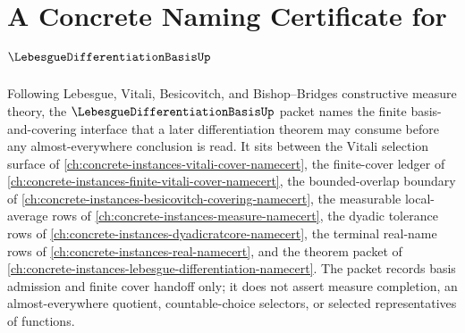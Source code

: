 \chapter{A Concrete Naming Certificate for $\LebesgueDifferentiationBasisUp$}
\label{ch:concrete-instances-lebesgue-differentiation-basis-namecert}

Following Lebesgue, Vitali, Besicovitch, and Bishop--Bridges constructive measure theory, the $\LebesgueDifferentiationBasisUp$ packet names the finite basis-and-covering interface that a later differentiation theorem may consume before any almost-everywhere conclusion is read. It sits between the Vitali selection surface of \autoref{ch:concrete-instances-vitali-cover-namecert}, the finite-cover ledger of \autoref{ch:concrete-instances-finite-vitali-cover-namecert}, the bounded-overlap boundary of \autoref{ch:concrete-instances-besicovitch-covering-namecert}, the measurable local-average rows of \autoref{ch:concrete-instances-measure-namecert}, the dyadic tolerance rows of \autoref{ch:concrete-instances-dyadicratcore-namecert}, the terminal real-name rows of \autoref{ch:concrete-instances-real-namecert}, and the theorem packet of \autoref{ch:concrete-instances-lebesgue-differentiation-namecert}. The packet records basis admission and finite cover handoff only; it does not assert measure completion, an almost-everywhere quotient, countable-choice selectors, or selected representatives of functions.

